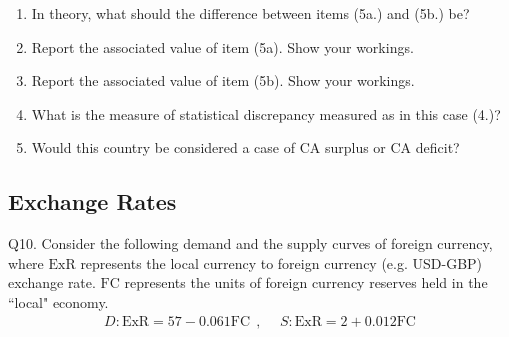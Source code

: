 \documentclass[12pt]{article}
\begin{document}
\begin{enumerate}[1)]
	\item In theory, what should the difference between items (5a.) and (5b.) be?
	
	\vspace{0.4in}
	
	\item Report the associated value of item (5a). Show your workings.
	
	\vspace{0.4in}
	\vspace{0.2in}
	
	\item Report the associated value of item (5b). Show your workings.
	
	\vspace{0.4in}
	\vspace{0.2in}
	
	\item What is the measure of statistical discrepancy measured as in this case (4.)?
	
	\vspace{0.4in}
	\vspace{0.2in}
	
	\item Would this country be considered a case of CA surplus or CA deficit?
	
	\vspace{0.4in}	
	\vspace{0.2in} 
	
\end{enumerate}


\subsection*{Exchange Rates}

\noindent Q10. Consider the following demand and the supply curves of foreign currency, where $\text{ExR}$ represents the local currency to foreign currency (e.g. USD-GBP) exchange rate.
$\text{FC}$ represents the units of foreign currency reserves held in the ``local" economy. 
\begin{align*}
D: \text{ExR} =  57 - 0.061 \text{FC} \ \ , & \ \ S: \text{ExR} =  2 + 0.012 \text{FC}
\end{align*}
\end{document}
